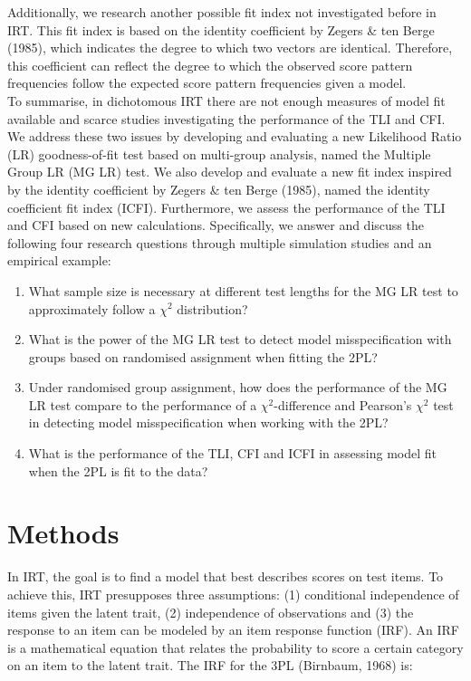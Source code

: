 \documentclass[Royal,sageapa,times,doublespace]{sagej}
\begin{document}
\indent Additionally, we research another possible fit index not investigated before in IRT. This fit index is based on the identity coefficient by Zegers \& ten Berge (1985), which indicates the degree to which two vectors are identical. Therefore, this coefficient can reflect the degree to which the observed score pattern frequencies follow the expected score pattern frequencies given a model. \\
\indent To summarise, in dichotomous IRT there are not enough measures of model fit available and scarce studies investigating the performance of the TLI and CFI. We address these two issues by developing and evaluating a new Likelihood Ratio (LR) goodness-of-fit test based on multi-group analysis, named the Multiple Group LR (MG LR) test. We also develop and evaluate a new fit index inspired by the identity coefficient by Zegers \& ten Berge (1985), named the identity coefficient fit index (ICFI). Furthermore, we assess the performance of the TLI and CFI based on new calculations. Specifically, we answer and discuss the following four research questions through multiple simulation studies and an empirical example: \\
\begin{enumerate}
\item{What sample size is necessary at different test lengths for the MG LR test to approximately follow a $\chi^2$ distribution?}
\item{What is the power of the MG LR test to detect model misspecification with groups based on randomised assignment when fitting the 2PL?}
\item{Under randomised group assignment, how does the performance of the MG LR test compare to the performance of a $\chi^2$-difference and Pearson's $\chi^2$ test in detecting model misspecification when working with the 2PL?}
\item{What is the performance of the TLI, CFI and ICFI in assessing model fit when the 2PL is fit to the data?}
\end{enumerate}

\section{\centering Methods}
In IRT, the goal is to find a model that best describes scores on test items. To achieve this, IRT presupposes three assumptions: (1) conditional independence of items given the latent trait, (2) independence of observations and (3) the response to an item can be modeled by an item response function (IRF). An IRF is a mathematical equation that relates the probability to score a certain category on an item to the latent trait. The IRF for the 3PL (Birnbaum, 1968) is:
\end{document}
